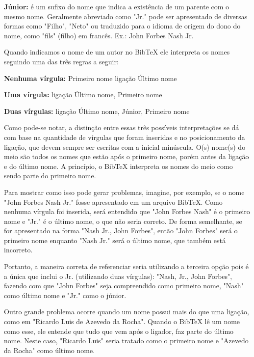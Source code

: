 \begin{anexosenv}
\begin{compactitem}
\item \textbf{Júnior:} é um sufixo do nome que indica a existência de um parente com o mesmo nome. Geralmente abreviado como "Jr."{} pode ser apresentado de diversas formas como "Filho"{}, "Neto"{} ou traduzido para o idioma de origem do dono do nome, como "fils"{} (filho) em francês. Ex.: John Forbes Nash Jr.
\end{compactitem}

Quando indicamos o nome de um autor no BibTeX ele interpreta os nomes seguindo uma das três regras a seguir:

\begin{compactenum}
    \item \textbf{Nenhuma vírgula:} {Primeiro nome} {ligação} {Último nome}

    \item \textbf{Uma vírgula:} {ligação} {Último nome}, {Primeiro nome}

    \item \textbf{Duas vírgulas:} {ligação} {Último nome}, {Júnior}, {Primeiro nome}
\end{compactenum}

Como pode-se notar, a distinção entre essas três possíveis interpretações se dá com base na quantidade de vírgulas que foram inseridas e no posicionamento da ligação, que devem sempre ser escritas com a inicial minúscula. O(s) nome(s) do meio são todos os nomes que estão após o primeiro nome, porém antes da ligação e do último nome. A princípio, o BibTeX interpreta os nomes do meio como sendo parte do primeiro nome.

Para mostrar como isso pode gerar problemas, imagine, por exemplo, se o nome "John Forbes Nash Jr."{} fosse apresentado em um arquivo BibTeX. Como nenhuma vírgula foi inserida, será entendido que "John Forbes Nash"{} é o primeiro nome e "Jr."{} é o último nome, o que não seria correto. De forma semelhante, se for apresentado na forma "Nash Jr., John Forbes", então "John Forbes"{} será o primeiro nome enquanto "Nash Jr."{} será o último nome, que também está incorreto.

Portanto, a maneira correta de referenciar seria utilizando a terceira opção pois é a única que inclui o Jr. (utilizando duas vírgulas): "Nash, Jr., John Forbes"{}, fazendo com que "John Forbes"{} seja compreendido como primeiro nome, "Nash"{} como último nome e "Jr."{} como o júnior.

Outro grande problema ocorre quando um nome possui mais do que uma ligação, como em "Ricardo Luis de Azevedo da Rocha"{}. Quando o BibTeX lê um nome como esse, ele entende que tudo que vem após o ligador, faz parte do último nome. Neste caso, "Ricardo Luis"{} seria tratado como o primeiro nome e "Azevedo da Rocha"{} como último nome.


\end{anexosenv}
